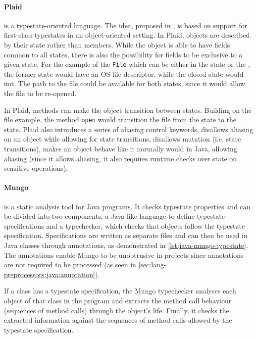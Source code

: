 \paragraph{Plaid} is a typestate-oriented language.
The idea, proposed in \autocite{Aldrich2009}, is based on support for first-class typestates in an object-oriented setting.
In Plaid, objects are described by their state rather than members.
While the object is able to have fields common to all states, there is also the possibility for fields to be exclusive to a given state.
For the example of the \texttt{File} which can be either in the  state or the , the former state would have an OS file descriptor,
while the closed state would not. The path to the file could be available for both states, since it would allow the file to be re-opened.

In Plaid, methods can make the object transition between states. Building on the file example,
the method \texttt{open} would transition the file from the  state to the  state.
Plaid also introduces a series of aliasing control keywords,
 disallows aliasing on an object while allowing for state transitions,
 disallows mutation (i.e. state transitions),
 makes an object behave like it normally would in Java,
allowing aliasing (since it allows aliasing, it also requires runtime checks over state on sensitive operations).

\paragraph{Mungo} is a static analysis tool \autocite{Dardha2017, Kouzapas2018, Voinea2020} for Java programs.
It checks typestate properties and can be divided into two components, a Java-like language to define typestate specifications
and a typechecker, which checks that objects follow the typestate specification.
Specifications are written as separate files and can then be used in Java classes through annotations, as demonstrated in \autoref{lst:java-mungo-typestate}.
The annotations enable Mungo to be unobtrusive in projects since annotations are not required to be processed (as seen in \autoref{sec:lang-preprocessors:java:annotation}).
\begin{displayquote}
If a class has a typestate specification, the Mungo typechecker analyses each object of that class in the program and extracts the method call behaviour (sequences of method calls) through
the object’s life. Finally, it checks the extracted information against the sequences of method calls allowed by the typestate specification.
\end{displayquote}

